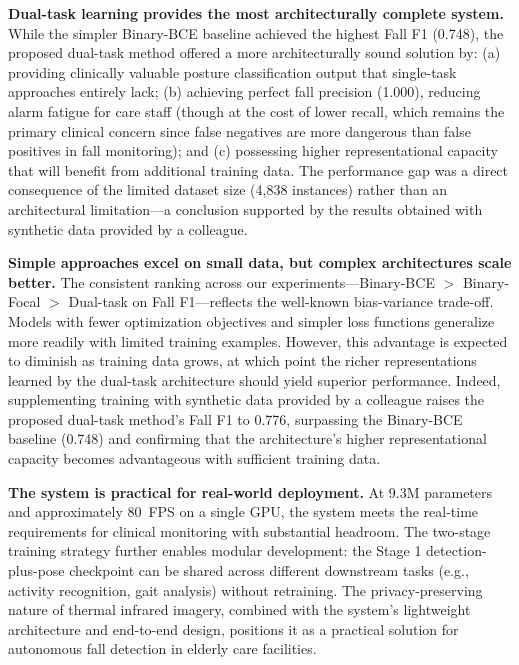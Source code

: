 \textbf{Dual-task learning provides the most architecturally complete system.} While the simpler Binary-BCE baseline achieved the highest Fall F1 (0.748), the proposed dual-task method offered a more architecturally sound solution by: (a) providing clinically valuable posture classification output that single-task approaches entirely lack; (b) achieving perfect fall precision (1.000), reducing alarm fatigue for care staff (though at the cost of lower recall, which remains the primary clinical concern since false negatives are more dangerous than false positives in fall monitoring); and (c) possessing higher representational capacity that will benefit from additional training data. The performance gap was a direct consequence of the limited dataset size (4{,}838 instances) rather than an architectural limitation---a conclusion supported by the results obtained with synthetic data provided by a colleague.

\textbf{Simple approaches excel on small data, but complex architectures scale better.} The consistent ranking across our experiments---Binary-BCE $>$ Binary-Focal $>$ Dual-task on Fall F1---reflects the well-known bias-variance trade-off. Models with fewer optimization objectives and simpler loss functions generalize more readily with limited training examples. However, this advantage is expected to diminish as training data grows, at which point the richer representations learned by the dual-task architecture should yield superior performance. Indeed, supplementing training with synthetic data provided by a colleague raises the proposed dual-task method's Fall F1 to 0.776, surpassing the Binary-BCE baseline (0.748) and confirming that the architecture's higher representational capacity becomes advantageous with sufficient training data.

\textbf{The system is practical for real-world deployment.} At 9.3M parameters and approximately 80~FPS on a single GPU, the system meets the real-time requirements for clinical monitoring with substantial headroom. The two-stage training strategy further enables modular development: the Stage 1 detection-plus-pose checkpoint can be shared across different downstream tasks (e.g., activity recognition, gait analysis) without retraining. The privacy-preserving nature of thermal infrared imagery, combined with the system's lightweight architecture and end-to-end design, positions it as a practical solution for autonomous fall detection in elderly care facilities.

